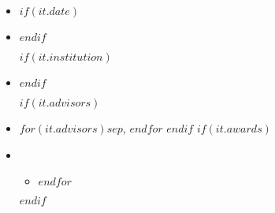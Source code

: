 \begin{itemize}[itemsep=0pt]

  \item {}

  $if(it.date)$\item {}$endif$

  $if(it.institution)$\item {}$endif$

  $if(it.advisors)$\item \quad {}
  $for(it.advisors)$$sep$, $endfor$
  $endif$
  $if(it.awards)$\item \quad \printawardsheading
  \begin{itemize}[label=\(\diamond\),leftmargin=20pt,itemsep=0pt]
    $for(it.awards)$\item {}$endfor$
  \end{itemize}
  $endif$
\end{itemize}

